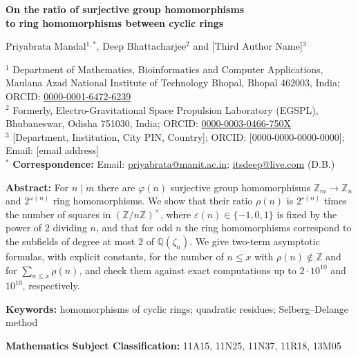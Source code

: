 \documentclass[11pt]{article}
\theoremstyle{definition}
\newcommand{\Z}{\mathbb{Z}}
\newcommand{\Q}{\mathbb{Q}}
\renewcommand{\phi}{\varphi}
\renewcommand{\epsilon}{\varepsilon}
\begin{document}

\vspace{6mm}
\begin{center}
{\Large\bfseries On the ratio of surjective group homomorphisms\\[2pt] to ring homomorphisms between cyclic rings}

\vspace{5mm}
{\large Priyabrata Mandal$^{1,*}$, Deep Bhattacharjee$^{2}$ and [Third Author Name]$^{3}$}

\vspace{3mm}
{\small
$^{1}$ Department of Mathematics, Bioinformatics and Computer Applications, Maulana Azad National Institute of Technology Bhopal, Bhopal 462003, India; ORCID: \href{https://orcid.org/0000-0001-6472-6239}{0000-0001-6472-6239}\\
$^{2}$ Formerly, Electro-Gravitational Space Propulsion Laboratory (EGSPL), Bhubaneswar, Odisha 751030, India; ORCID: \href{https://orcid.org/0000-0003-0466-750X}{0000-0003-0466-750X}\\
$^{3}$ [Department, Institution, City PIN, Country]; ORCID: [0000-0000-0000-0000]; Email: [email address]\\[2pt]
$^{*}$ \textbf{Correspondence:} Email: \href{mailto:priyabrata@manit.ac.in}{priyabrata@manit.ac.in}; \href{mailto:itsdeep@live.com}{itsdeep@live.com} (D.B.)}
\end{center}

\vspace{4mm}
\noindent\textbf{Abstract:}
For $n\mid m$ there are $\phi(n)$ surjective group homomorphisms $\Z_m\to\Z_n$ and $2^{\omega(n)}$ ring homomorphisms. We show that their ratio $\rho(n)$ is $2^{\epsilon(n)}$ times the number of squares in $(\Z/n\Z)^\times$, where $\epsilon(n)\in\{-1,0,1\}$ is fixed by the power of $2$ dividing $n$, and that for odd $n$ the ring homomorphisms correspond to the subfields of degree at most $2$ of $\Q(\zeta_n)$. We give two-term asymptotic formulas, with explicit constants, for the number of $n\le x$ with $\rho(n)\notin\Z$ and for $\sum_{n\le x}\rho(n)$, and check them against exact computations up to $2\cdot10^{10}$ and $10^{10}$, respectively.

\vspace{2mm}
\noindent\textbf{Keywords:} homomorphisms of cyclic rings; quadratic residues; Selberg--Delange method

\vspace{1mm}
\noindent\textbf{Mathematics Subject Classification:} 11A15, 11N25, 11N37, 11R18, 13M05
\end{document}
